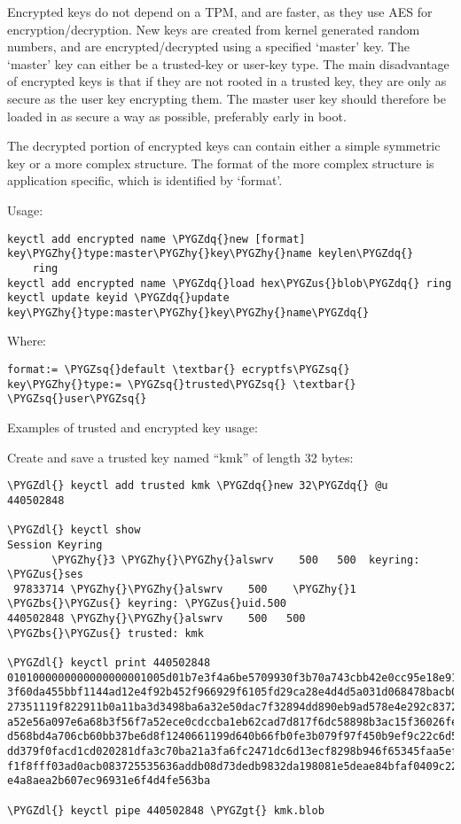 \documentclass[a4paper,8pt,english]{sphinxmanual}
\def\PYGZbs{\char`\\}
\def\PYGZus{\char`\_}
\def\PYGZgt{\char`\>}
\def\PYGZdl{\char`\$}
\def\PYGZhy{\char`\-}
\def\PYGZsq{\char`\'}
\def\PYGZdq{\char`\"}
\renewcommand\PYGZsq{\textquotesingle}
\begin{document}
Encrypted keys do not depend on a TPM, and are faster, as they use AES for
encryption/decryption.  New keys are created from kernel generated random
numbers, and are encrypted/decrypted using a specified `master' key.  The
`master' key can either be a trusted-key or user-key type.  The main
disadvantage of encrypted keys is that if they are not rooted in a trusted key,
they are only as secure as the user key encrypting them.  The master user key
should therefore be loaded in as secure a way as possible, preferably early in
boot.

The decrypted portion of encrypted keys can contain either a simple symmetric
key or a more complex structure. The format of the more complex structure is
application specific, which is identified by `format'.

Usage:

\begin{Verbatim}[commandchars=\\\{\}]
keyctl add encrypted name \PYGZdq{}new [format] key\PYGZhy{}type:master\PYGZhy{}key\PYGZhy{}name keylen\PYGZdq{}
    ring
keyctl add encrypted name \PYGZdq{}load hex\PYGZus{}blob\PYGZdq{} ring
keyctl update keyid \PYGZdq{}update key\PYGZhy{}type:master\PYGZhy{}key\PYGZhy{}name\PYGZdq{}
\end{Verbatim}

Where:

\begin{Verbatim}[commandchars=\\\{\}]
format:= \PYGZsq{}default \textbar{} ecryptfs\PYGZsq{}
key\PYGZhy{}type:= \PYGZsq{}trusted\PYGZsq{} \textbar{} \PYGZsq{}user\PYGZsq{}
\end{Verbatim}

Examples of trusted and encrypted key usage:

Create and save a trusted key named ``kmk'' of length 32 bytes:

\begin{Verbatim}[commandchars=\\\{\}]
\PYGZdl{} keyctl add trusted kmk \PYGZdq{}new 32\PYGZdq{} @u
440502848

\PYGZdl{} keyctl show
Session Keyring
       \PYGZhy{}3 \PYGZhy{}\PYGZhy{}alswrv    500   500  keyring: \PYGZus{}ses
 97833714 \PYGZhy{}\PYGZhy{}alswrv    500    \PYGZhy{}1   \PYGZbs{}\PYGZus{} keyring: \PYGZus{}uid.500
440502848 \PYGZhy{}\PYGZhy{}alswrv    500   500       \PYGZbs{}\PYGZus{} trusted: kmk

\PYGZdl{} keyctl print 440502848
0101000000000000000001005d01b7e3f4a6be5709930f3b70a743cbb42e0cc95e18e915
3f60da455bbf1144ad12e4f92b452f966929f6105fd29ca28e4d4d5a031d068478bacb0b
27351119f822911b0a11ba3d3498ba6a32e50dac7f32894dd890eb9ad578e4e292c83722
a52e56a097e6a68b3f56f7a52ece0cdccba1eb62cad7d817f6dc58898b3ac15f36026fec
d568bd4a706cb60bb37be6d8f1240661199d640b66fb0fe3b079f97f450b9ef9c22c6d5d
dd379f0facd1cd020281dfa3c70ba21a3fa6fc2471dc6d13ecf8298b946f65345faa5ef0
f1f8fff03ad0acb083725535636addb08d73dedb9832da198081e5deae84bfaf0409c22b
e4a8aea2b607ec96931e6f4d4fe563ba

\PYGZdl{} keyctl pipe 440502848 \PYGZgt{} kmk.blob
\end{Verbatim}
\end{document}
